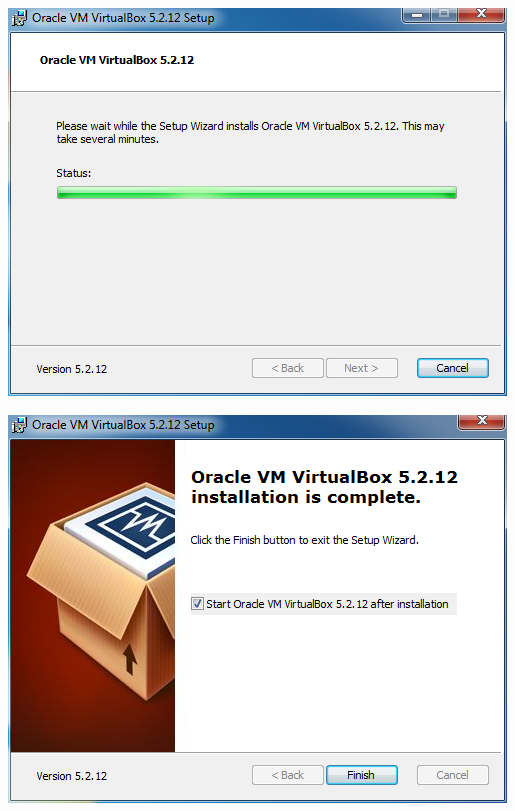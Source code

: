 \begin{center}
		\includegraphics[width=\linewidth]{Anexo01/oracleVirtualBox07.png}

		\includegraphics[width=\linewidth]{Anexo01/oracleVirtualBox08.png}
\end{center}